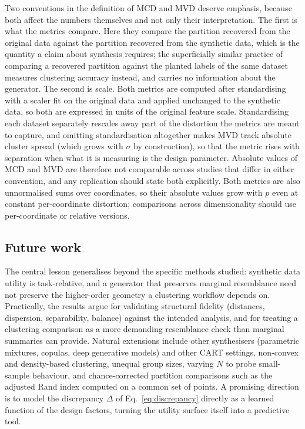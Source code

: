 \documentclass[pdflatex,sn-basic]{sn-jnl}
\begin{document}
Two conventions in the definition of MCD and MVD deserve emphasis, because both
affect the numbers themselves and not only their interpretation. The first is
what the metrics compare. Here they compare the partition recovered from the
original data against the partition recovered from the synthetic data, which is
the quantity a claim about synthesis requires; the superficially similar
practice of comparing a recovered partition against the planted labels of the
same dataset measures clustering accuracy instead, and carries no information
about the generator. The second is scale. Both metrics are computed after
standardising with a scaler fit on the original data and applied unchanged to
the synthetic data, so both are expressed in units of the original feature
scale. Standardising each dataset separately rescales away part of the
distortion the metrics are meant to capture, and omitting standardisation
altogether makes MVD track absolute cluster spread (which grows with $\sigma$
by construction), so that the metric rises with separation when what it is
measuring is the design parameter. Absolute values of MCD and MVD are therefore
not comparable across studies that differ in either convention, and any
replication should state both explicitly. Both metrics are also unnormalised sums over
coordinates, so their absolute values grow with $p$ even at constant
per-coordinate distortion; comparisons across dimensionality should use
per-coordinate or relative versions.

\subsection{Future work}
\label{sec:future}

The central lesson generalises beyond the specific methods studied: synthetic
data utility is task-relative, and a generator that preserves marginal
resemblance need not preserve the higher-order geometry a clustering workflow
depends on. Practically, the results argue for validating structural fidelity
(distances, dispersion, separability, balance) against the intended analysis,
and for treating a clustering comparison as a more demanding resemblance check
than marginal summaries can provide. Natural extensions include other
synthesisers (parametric mixtures, copulas, deep generative models) and other
CART settings, non-convex and density-based clustering, unequal group sizes,
varying $N$ to probe small-sample behaviour, and chance-corrected partition
comparisons such as the adjusted Rand index \citep{hubert1985} computed on a
common set of points. A promising direction is to model the discrepancy
$\Delta$ of Eq.~\eqref{eq:discrepancy} directly as a learned function of the
design factors, turning the utility surface itself into a predictive tool.
\end{document}
